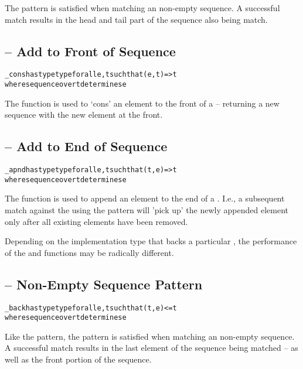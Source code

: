 The  pattern is satisfied when matching an non-empty sequence. A successful match results in the head and tail part of the sequence also being match.

\subsection{ -- Add to Front of Sequence}
\label{consFunction}
\begin{alltt}
\_cons has type type for all e,t such that (e,t)=>t
                     where sequence over t determines e
\end{alltt}
The  function is used to `cons' an element to the front of a  -- returning a new sequence with the new element at the front.

\subsection{ -- Add to End of Sequence}
\label{appendFunction}
\begin{alltt}
\_apnd has type type for all e,t such that (t,e)=>t
                     where sequence over t determines e
\end{alltt}
The  function is used to append an element to the end of a . I.e., a subsequent match against the  using the  pattern will 'pick up' the newly appended element only after all existing elements have been removed.

\begin{aside}
Depending on the implementation type that backs a particular , the performance of the  and  functions may be radically different.
\end{aside}

\subsection{ -- Non-Empty Sequence Pattern}
\label{backPattern}
\begin{alltt}
\_back has type type for all e,t such that (t,e)<=t
                     where sequence over t determines e
\end{alltt}

Like the  pattern, the  pattern is satisfied when matching an non-empty sequence. A successful match results in the last element of the sequence being matched -- as well as the front portion of the sequence.

